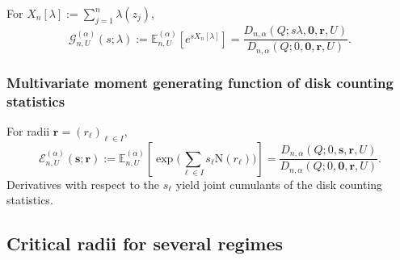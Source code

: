 \documentclass[a4paper]{article}
\numberwithin{equation}{section}
\begin{document}
For $X_n[\lambda]:=\sum_{j=1}^n\lambda(z_j)$,
\begin{equation}
\label{def of MGF smooth test f}
\mathcal G_{n,U}^{(\alpha)}(s;\lambda)
:=\mathbb E_{n,U}^{(\alpha)}\!\left[e^{sX_n[\lambda]}\right]
=\frac{D_{n,\alpha}(Q;s\lambda,\boldsymbol0,\boldsymbol r,U)}{D_{n,\alpha}(Q;0,\boldsymbol0,\boldsymbol r,U)}.
\end{equation}

\subsubsection*{Multivariate moment generating function of disk counting statistics}

For radii $\boldsymbol r=(r_\ell)_{\ell\in I}$,
\begin{equation}
\label{def of multivariate MGF disk counting statistics}
\mathcal E_{n,U}^{(\alpha)}(\boldsymbol s;\boldsymbol r)
:=\mathbb E_{n,U}^{(\alpha)}\!\left[
\exp\bigg(\sum_{\ell\in I}s_\ell\mathrm N(r_\ell)\bigg)
\right]
=\frac{D_{n,\alpha}(Q;0,\boldsymbol s,\boldsymbol r,U)}{D_{n,\alpha}(Q;0,\boldsymbol0,\boldsymbol r,U)}.
\end{equation}
Derivatives with respect to the $s_\ell$ yield joint cumulants of the disk counting statistics.

\subsection{Critical radii for several regimes}
\end{document}

